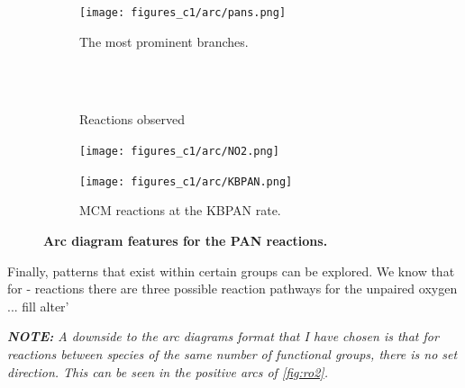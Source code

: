 \begin{figure}[H]
     \centering
      \begin{subfigure}[b]{.4\textwidth}
         \centering
         \texttt{[image: figures\_c1/arc/pans.png]}
         \caption{The most prominent branches. }
         \label{fig:pansdir}
     \end{subfigure}
      \begin{subfigure}[b]{.4\textwidth}
         \centering
            \\ \ \\
    \hfill
         \caption{Reactions observed}
         \label{fig:rxnpan}
     \end{subfigure}
     \begin{subfigure}[b]{.4\textwidth}
         \centering
         \texttt{[image: figures\_c1/arc/NO2.png]}
         \caption{}
         \label{fig:no2}
     \end{subfigure}
     \begin{subfigure}[b]{.4\textwidth}
         \centering
         \texttt{[image: figures\_c1/arc/KBPAN.png]}
         \caption{MCM reactions at the KBPAN rate.}
         \label{fig:kbpan}
     \end{subfigure}
      \caption{\textbf{ Arc diagram features for the PAN reactions. } }
        \label{fig:ohho2}
\end{figure}

Finally, patterns that exist within certain groups can be explored. We know that for - reactions there are three possible reaction pathways for the unpaired oxygen ... fill alter'


\textit{\textbf{NOTE:} A downside to the arc diagrams format that I have chosen is that for reactions between species of the same number of functional groups, there is no set direction. This can be seen in the positive arcs of  \autoref{fig:ro2}. }




